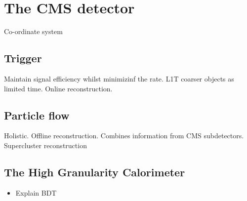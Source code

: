 \chapter{The CMS detector}
\label{chap:cms}

Co-ordinate system

\section{Trigger}\label{sec:trigger}
Maintain signal efficiency whilst minimizinf the rate. L1T coarser objects as limited time. Online reconstruction.

\section{Particle flow}\label{sec:particle_flow}
Holistic.
Offline reconstruction. Combines information from CMS subdetectors. Supercluster reconstruction


\section{The High Granularity Calorimeter}
\begin{itemize}
    \item Explain BDT
\end{itemize}
